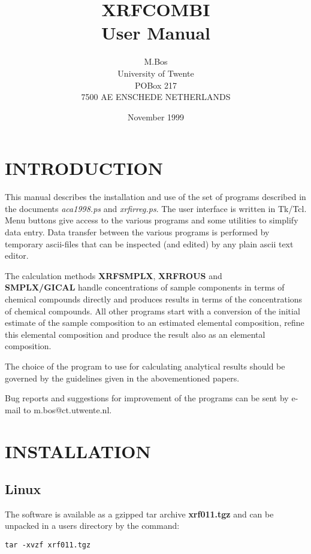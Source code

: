 \title{XRFCOMBI\\
User Manual}
\author{M.Bos\\
University of Twente\\
POBox 217\\
7500 AE ENSCHEDE
NETHERLANDS}
\date{November 1999}

\maketitle
\section{INTRODUCTION}
This manual describes the installation and use of the set of
programs described in the documents {\em aca1998.ps} and 
{\em xrfirreg.ps}. The user interface
is written in Tk/Tcl. Menu buttons give access to the various programs
and some utilities to simplify data entry. Data transfer between
the various programs is performed by temporary ascii-files that can be inspected
(and edited) by any plain ascii text editor.

The calculation methods {\bf XRFSMPLX}, {\bf XRFROUS} and\\
{\bf SMPLX/GICAL}  handle concentrations of
sample components in terms of chemical compounds directly and produces
results in terms of the concentrations of chemical compounds. All other
programs start with a conversion of the initial  estimate of the
sample composition to an estimated elemental composition, refine this
elemental composition and produce the result also as an elemental composition.

The choice of the program to use for calculating analytical results
should be governed by the guidelines given in the abovementioned papers.

Bug reports and suggestions for improvement of the programs can be sent
by e-mail to m.bos@ct.utwente.nl.

\section{INSTALLATION}
\subsection{Linux}
The software is available as a gzipped tar archive {\bf xrf011.tgz}
and can be unpacked in  a users directory by the command:
\begin{verbatim}
tar -xvzf xrf011.tgz
\end{verbatim}

